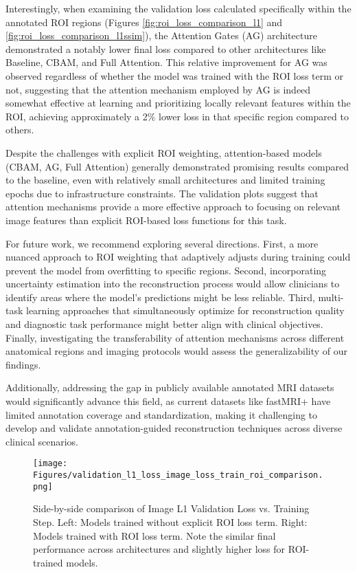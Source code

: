 \documentclass[
	letterpaper, %
]{jdf}
\begin{document}
Interestingly, when examining the validation loss calculated specifically within the annotated ROI regions (Figures \ref{fig:roi_loss_comparison_l1} and \ref{fig:roi_loss_comparison_l1ssim}), the Attention Gates (AG) architecture demonstrated a notably lower final loss compared to other architectures like Baseline, CBAM, and Full Attention. This relative improvement for AG was observed regardless of whether the model was trained with the ROI loss term or not, suggesting that the attention mechanism employed by AG is indeed somewhat effective at learning and prioritizing locally relevant features within the ROI, achieving approximately a 2\% lower loss in that specific region compared to others. 

Despite the challenges with explicit ROI weighting, attention-based models (CBAM, AG, Full Attention) generally demonstrated promising results compared to the baseline, even with relatively small architectures and limited training epochs due to infrastructure constraints. The validation plots suggest that attention mechanisms provide a more effective approach to focusing on relevant image features than explicit ROI-based loss functions for this task.

For future work, we recommend exploring several directions. First, a more nuanced approach to ROI weighting that adaptively adjusts during training could prevent the model from overfitting to specific regions. Second, incorporating uncertainty estimation into the reconstruction process would allow clinicians to identify areas where the model's predictions might be less reliable. Third, multi-task learning approaches that simultaneously optimize for reconstruction quality and diagnostic task performance might better align with clinical objectives. Finally, investigating the transferability of attention mechanisms across different anatomical regions and imaging protocols would assess the generalizability of our findings.

Additionally, addressing the gap in publicly available annotated MRI datasets would significantly advance this field, as current datasets like fastMRI+ have limited annotation coverage and standardization, making it challenging to develop and validate annotation-guided reconstruction techniques across diverse clinical scenarios.

\begin{figure*}[htbp]
    \centering
    \texttt{[image: Figures/validation\_l1\_loss\_image\_loss\_train\_roi\_comparison.png]}
    \caption{Side-by-side comparison of Image L1 Validation Loss vs. Training Step. Left: Models trained without explicit ROI loss term. Right: Models trained with ROI loss term. Note the similar final performance across architectures and slightly higher loss for ROI-trained models.}
    \label{fig:image_loss_comparison_l1}
\end{figure*}
\end{document}
